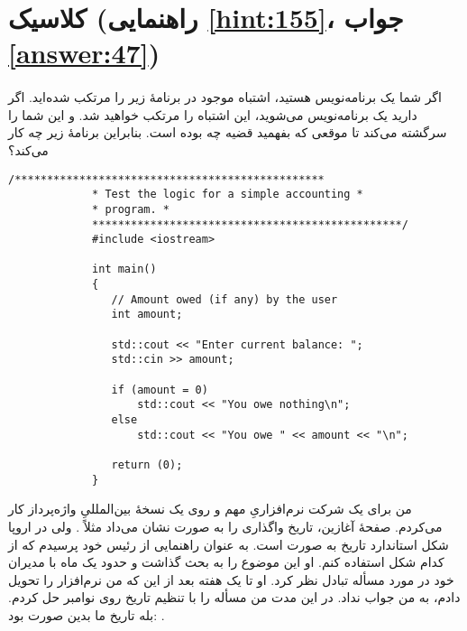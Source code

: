 \section[کلاسیک]{کلاسیک \protect{} (راهنمایی \ref{hint:155}، جواب \ref{answer:47})}
\paragraph{}\label{prog:18}
اگر شما یک برنامه‌نویس هستید، اشتباه موجود در برنامهٔ زیر را مرتکب شده‌اید. اگر دارید یک برنامه‌نویس می‌شوید، این اشتباه را مرتکب خواهید شد. و این شما را سرگشته می‌کند تا موقعی که بفهمید قضیه چه بوده است. بنابراین برنامهٔ زیر چه کار می‌کند؟

\begin{LTR}
        \begin{lstlisting}[style=C++Style]
             /************************************************
             * Test the logic for a simple accounting *
             * program. *
             ************************************************/
             #include <iostream>

             int main()
             {
             	// Amount owed (if any) by the user
             	int amount;

             	std::cout << "Enter current balance: ";
             	std::cin >> amount;

             	if (amount = 0)
             		std::cout << "You owe nothing\n";
             	else
             		std::cout << "You owe " << amount << "\n";

             	return (0);
             }
        \end{lstlisting}
\end{LTR}

\begin{tcolorbox}
    من برای یک شرکت نرم‌افزاریِ مهم و روی یک نسخهٔ بین‌المللیِ واژه‌پرداز کار می‌کردم. صفحهٔ آغازین، تاریخ واگذاری را به صورت  نشان می‌داد مثلاً . ولی در اروپا شکل استاندارد تاریخ به صورت  است. به عنوان راهنمایی از رئیس خود پرسیدم که از کدام شکل استفاده کنم. او این موضوع را به بحث گذاشت و حدود یک ماه با مدیران خود در مورد مسأله تبادل نظر کرد. او تا یک هفته بعد از این که من نرم‌افزار را تحویل دادم، به من جواب نداد. در این مدت من مسأله را با تنظیم تاریخ روی  نوامبر حل کردم. بله تاریخ ما بدین صورت بود: .
\end{tcolorbox}